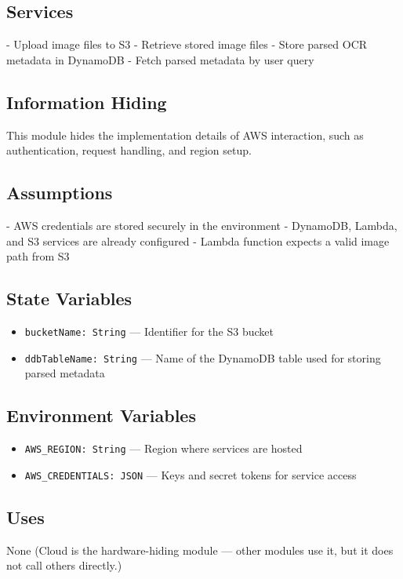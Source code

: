 \documentclass[12pt, titlepage]{article}
\begin{document}
\subsection*{Services}
- Upload image files to S3  
- Retrieve stored image files  
- Store parsed OCR metadata in DynamoDB  
- Fetch parsed metadata by user query  

\subsection*{Information Hiding}
This module hides the implementation details of AWS interaction, such as authentication, request handling, and region setup.

\subsection*{Assumptions}
- AWS credentials are stored securely in the environment  
- DynamoDB, Lambda, and S3 services are already configured  
- Lambda function expects a valid image path from S3

\subsection*{State Variables}
\begin{itemize}
  \item \texttt{bucketName: String} — Identifier for the S3 bucket
  \item \texttt{ddbTableName: String} — Name of the DynamoDB table used for storing parsed metadata
\end{itemize}

\subsection*{Environment Variables}
\begin{itemize}
  \item \texttt{AWS\_REGION: String} — Region where services are hosted
  \item \texttt{AWS\_CREDENTIALS: JSON} — Keys and secret tokens for service access
\end{itemize}

\subsection*{Uses}
None (Cloud is the hardware-hiding module — other modules use it, but it does not call others directly.)
\end{document}
